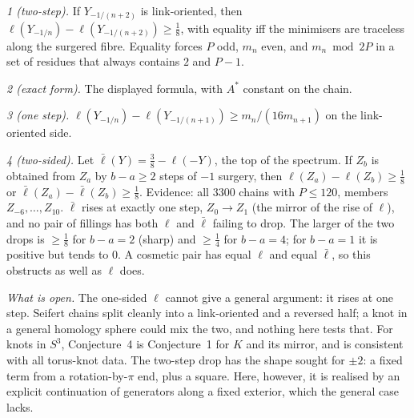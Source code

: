 \documentclass[10pt]{amsart}
\newcommand{\st}[1]{\par\noindent\textit{#1}\enspace}
\begin{document}
\st{1 (two-step).} If $Y_{-1/(n+2)}$ is link-oriented, then
$\ell(Y_{-1/n})-\ell(Y_{-1/(n+2)})\ge\frac18$, with equality iff the minimisers
are traceless along the surgered fibre. Equality forces $P$ odd, $m_n$ even, and
$m_n\bmod 2P$ in a set of residues that always contains $2$ and $P-1$.
\st{2 (exact form).} The displayed formula, with $A^*$ constant on the chain.
\st{3 (one step).} $\ell(Y_{-1/n})-\ell(Y_{-1/(n+1)})\ge m_n/(16m_{n+1})$ on the
link-oriented side.

\st{4 (two-sided).} Let $\bar\ell(Y)=\frac38-\ell(-Y)$, the top of the spectrum.
If $Z_b$ is obtained from $Z_a$ by $b-a\ge2$ steps of $-1$ surgery, then
$\ell(Z_a)-\ell(Z_b)\ge\frac18$ or $\bar\ell(Z_a)-\bar\ell(Z_b)\ge\frac18$.
Evidence: all $3300$ chains with $P\le120$, members $Z_{-6},\dots,Z_{10}$.
$\bar\ell$ rises at exactly one step, $Z_0\to Z_1$ (the mirror of the rise of
$\ell$), and no pair of fillings has both $\ell$ and $\bar\ell$ failing to drop.
The larger of the two drops is $\ge\frac18$ for $b-a=2$ (sharp) and $\ge\frac14$
for $b-a=4$; for $b-a=1$ it is positive but tends to $0$. A cosmetic pair has
equal $\ell$ and equal $\bar\ell$, so this obstructs as well as $\ell$ does.

\st{What is open.} The one-sided $\ell$ cannot give a general argument: it
rises at one step. Seifert chains split cleanly into a link-oriented and a
reversed half; a knot in a general homology sphere could mix the two, and
nothing here tests that. For knots in $S^3$, Conjecture~4 is Conjecture~1 for
$K$ and its mirror, and is consistent with all torus-knot data.
The two-step drop has the shape sought for $\pm2$: a fixed term from a
rotation-by-$\pi$ end, plus a square. Here, however, it is realised by an
explicit continuation of generators along a fixed exterior, which the general
case lacks.
\end{document}
